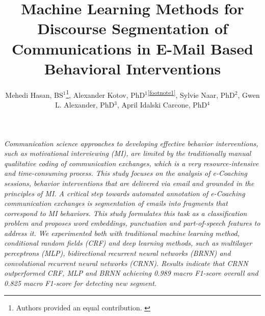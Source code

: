 \documentclass{amia}
\begin{document}
\title{Machine Learning Methods for Discourse Segmentation of Communications in E-Mail Based Behavioral Interventions}

\author{Mehedi Hasan, BS$^{1}$\footnote{Authors provided an equal contribution. \label{footnote1}}, Alexander Kotov, PhD$^{1}$\textsuperscript{\ref{footnote1}}, Sylvie Naar, PhD$^{2}$, Gwen L. Alexander, PhD$^{3}$, April Idalski Carcone, PhD$^{4}$}


\maketitle

\textit{Communication science approaches to developing effective behavior interventions, such as motivational interviewing (MI), are limited by the traditionally manual qualitative coding of communication exchanges, which is a very resource-intensive and time-consuming process. This study focuses on the analysis of e-Coaching sessions, behavior interventions that are delivered via email and grounded in the principles of MI. A critical step towards automated annotation of e-Coaching communication exchanges is segmentation of emails into fragments that correspond to MI behaviors. This study formulates this task as a classification problem and proposes word embeddings, punctuation and part-of-speech features to address it. We experimented both with traditional machine learning method, conditional random fields (CRF) and deep learning methods, such as multilayer perceptrons (MLP), bidirectional recurrent neural networks (BRNN) and convolutional recurrent neural networks (CRNN). Results indicate that CRNN outperformed CRF, MLP and BRNN achieving 0.989 macro F1-score overall and 0.825 macro F1-score for detecting new segment.}
\end{document}
